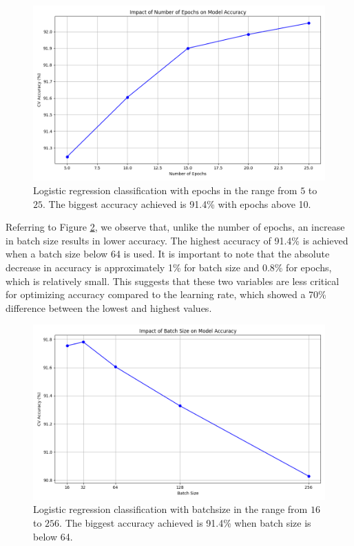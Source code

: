 \begin{figure}[H]
    \centering
    \includegraphics[width=\textwidth]{results/logreg/number_of_epochs_study.png}
    \caption{Logistic regression classification with epochs in the range from $5$ to $25$. The biggest accuracy achieved is 91.4\% with epochs above 10.}
    \label{fig:LogRegEpochs}
\end{figure}

\newpage
Referring to Figure \ref{fig:LogRegBatchsize}, we observe that, unlike the number of epochs, an increase in batch size results in lower accuracy. The highest accuracy of 91.4\% is achieved when a batch size below 64 is used. It is important to note that the absolute decrease in accuracy is approximately 1\% for batch size and 0.8\% for epochs, which is relatively small. This suggests that these two variables are less critical for optimizing accuracy compared to the learning rate, which showed a 70\% difference between the lowest and highest values.

\begin{figure}[H]
    \centering
    \includegraphics[width=\textwidth]{results/logreg/batch_size_study.png}
    \caption{Logistic regression classification with batchsize in the range from $16$ to $256$. The biggest accuracy achieved is 91.4\% when batch size is below 64.}
    \label{fig:LogRegBatchsize}
\end{figure}

